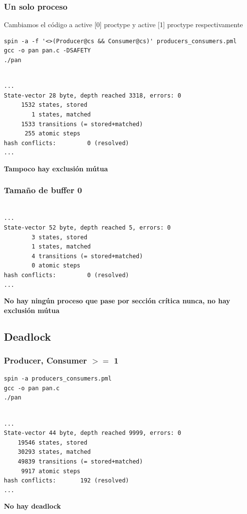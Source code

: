 \documentclass[a4paper,12pt]{article}
\begin{document}
\subsubsection{Un solo proceso}
Cambiamos el código a active [0] proctype y active [1] proctype respectivamente
\begin{lstlisting}
spin -a -f '<>(Producer@cs && Consumer@cs)' producers_consumers.pml
gcc -o pan pan.c -DSAFETY
./pan
\end{lstlisting}

\begin{lstlisting}[frame=single]  % Start your code-block

...
State-vector 28 byte, depth reached 3318, errors: 0
     1532 states, stored
        1 states, matched
     1533 transitions (= stored+matched)
      255 atomic steps
hash conflicts:         0 (resolved)
...
\end{lstlisting}
\textbf{Tampoco hay exclusión mútua}

\subsubsection{Tamaño de buffer 0}
\begin{lstlisting}[frame=single]  % Start your code-block

...
State-vector 52 byte, depth reached 5, errors: 0
        3 states, stored
        1 states, matched
        4 transitions (= stored+matched)
        0 atomic steps
hash conflicts:         0 (resolved)
...
\end{lstlisting}
\textbf{No hay ningún proceso que pase por sección crítica nunca, no hay exclusión mútua}

\subsection{Deadlock}
\subsubsection{Producer, Consumer $>=$ 1}

\begin{lstlisting}
spin -a producers_consumers.pml
gcc -o pan pan.c 
./pan
\end{lstlisting}

\begin{lstlisting}[frame=single]  % Start your code-block

...
State-vector 44 byte, depth reached 9999, errors: 0
    19546 states, stored
    30293 states, matched
    49839 transitions (= stored+matched)
     9917 atomic steps
hash conflicts:       192 (resolved)
...
\end{lstlisting}
\textbf{No hay deadlock}
\end{document}
